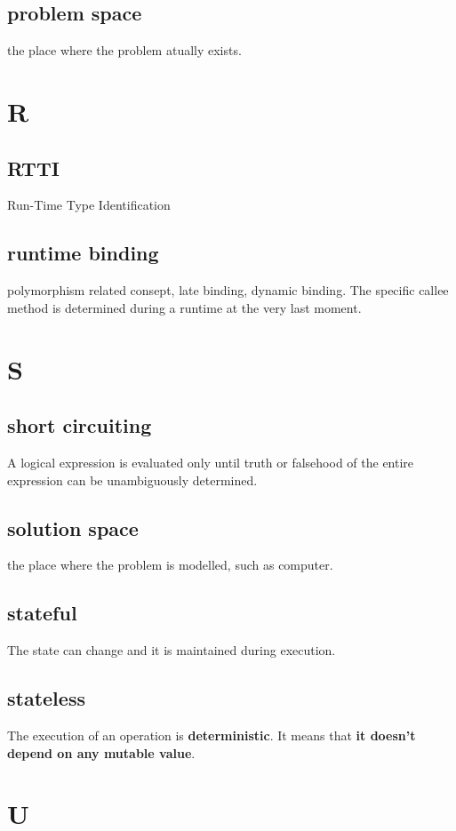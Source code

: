 \documentclass{report}
\begin{document}
\subsection{problem space}
the place where the problem atually exists.


\section{R}

\subsection{RTTI}
Run-Time Type Identification

\subsection{runtime binding}
polymorphism related consept, late binding, dynamic binding. The specific callee method is determined during a runtime at the very last moment.


\section{S}

\subsection{short circuiting}
A logical expression is evaluated only until truth or falsehood of the entire expression can be unambiguously determined.

\subsection{solution space}
the place where the problem is modelled, such as computer.

\subsection{stateful}
The state can change and it is maintained during execution.

\subsection{stateless}
The execution of an operation is \textbf{deterministic}. It means that
\textbf{it doesn't depend on any mutable value}.


\section{U}
\end{document}
